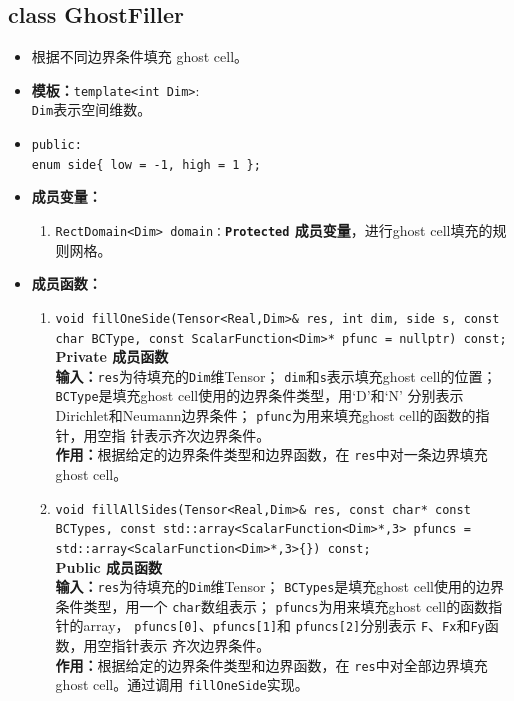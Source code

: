 \documentclass[a4paper,twoside]{ctexart}
\begin{document}
\subsection*{class GhostFiller}
\begin{itemize}
    \item 根据不同边界条件填充 ghost cell。
    \item \textbf{模板：}\texttt{template<int Dim>}:\\
      \texttt{Dim}表示空间维数。
    \item   \texttt{public:\\enum side\{
        low = -1,
        high = 1
        \};}
    \item \textbf{成员变量：}
      \begin{enumerate}[(1)]
      \item \texttt{RectDomain<Dim>
                domain：}\textbf{\texttt{Protected}  成员变量}，进行ghost cell填充的规则网格。
            \end{enumerate}
    \item \textbf{成员函数：}
        \begin{enumerate}[(1)]
        \item \texttt{void fillOneSide(Tensor<Real,Dim>\& res, int dim, side s, const char
                BCType, const ScalarFunction<Dim>* pfunc = nullptr) const;}\\
            \textbf{Private 成员函数}\\
            \textbf{输入：}\texttt{res}为待填充的\texttt{Dim}维Tensor；
            \texttt{dim}和\texttt{s}表示填充ghost cell的位置；
            \texttt{BCType}是填充ghost cell使用的边界条件类型，用`D'和`N'
            分别表示Dirichlet和Neumann边界条件；
                \texttt{pfunc}为用来填充ghost cell的函数的指针，用空指
                针表示齐次边界条件。\\
            \textbf{作用：}根据给定的边界条件类型和边界函数，在
            \texttt{res}中对一条边界填充ghost cell。
          \item \texttt{void fillAllSides(Tensor<Real,Dim>\& res,
              const char* const BCTypes, const
                    std::array<ScalarFunction<Dim>*,3> pfuncs =\\
                    std::array<ScalarFunction<Dim>*,3>\{\}) const;}\\
            \textbf{Public 成员函数}\\
            \textbf{输入：}\texttt{res}为待填充的\texttt{Dim}维Tensor；
            \texttt{BCTypes}是填充ghost cell使用的边界条件类型，用一个
            \texttt{char}数组表示；
                \texttt{pfuncs}为用来填充ghost cell的函数指针的array，
                \texttt{pfuncs[0]}、\texttt{pfuncs[1]}和
                \texttt{pfuncs[2]}分别表示
                \texttt{F}、\texttt{Fx}和\texttt{Fy}函数，用空指针表示
                齐次边界条件。\\
            \textbf{作用：}根据给定的边界条件类型和边界函数，在
            \texttt{res}中对全部边界填充ghost cell。通过调用
            \texttt{fillOneSide}实现。
        \end{enumerate}
\end{itemize}
\end{document}
